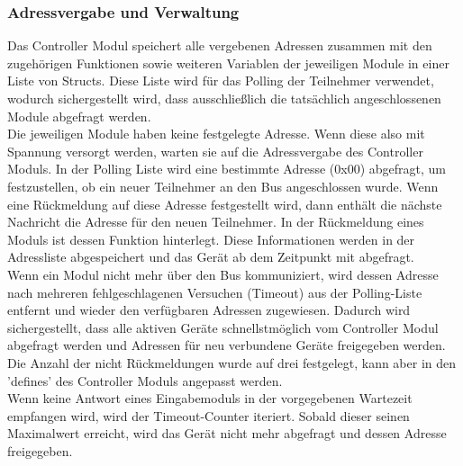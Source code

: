\subsubsection{Adressvergabe und Verwaltung}
Das Controller Modul speichert alle vergebenen Adressen zusammen mit den zugehörigen Funktionen sowie weiteren Variablen der jeweiligen Module in einer Liste von Structs. Diese Liste wird für das Polling der Teilnehmer verwendet, wodurch sichergestellt wird, dass ausschließlich die tatsächlich angeschlossenen Module abgefragt werden.\\





Die jeweiligen Module haben keine festgelegte Adresse. Wenn diese also mit Spannung versorgt werden, warten sie auf die Adressvergabe des Controller Moduls. In der Polling Liste wird eine bestimmte Adresse (0x00) abgefragt, um festzustellen, ob ein neuer Teilnehmer an den Bus angeschlossen wurde. Wenn eine Rückmeldung auf diese Adresse festgestellt wird, dann enthält die nächste Nachricht die Adresse für den neuen Teilnehmer. In der Rückmeldung eines Moduls ist dessen Funktion hinterlegt. Diese Informationen werden in der Adressliste abgespeichert und das Gerät ab dem Zeitpunkt mit abgefragt.\\



Wenn ein Modul nicht mehr über den Bus kommuniziert, wird dessen Adresse nach mehreren fehlgeschlagenen Versuchen (Timeout) aus der Polling-Liste entfernt und wieder den verfügbaren Adressen zugewiesen. Dadurch wird sichergestellt, dass alle aktiven Geräte schnellstmöglich vom Controller Modul abgefragt werden und Adressen für neu verbundene Geräte freigegeben werden. Die Anzahl der nicht Rückmeldungen wurde auf drei festgelegt, kann aber in den 'defines' des Controller Moduls angepasst werden.
\\



Wenn keine Antwort eines Eingabemoduls in der vorgegebenen Wartezeit empfangen wird, wird der Timeout-Counter iteriert. Sobald dieser seinen Maximalwert erreicht, wird das Gerät nicht mehr abgefragt und dessen Adresse freigegeben.



